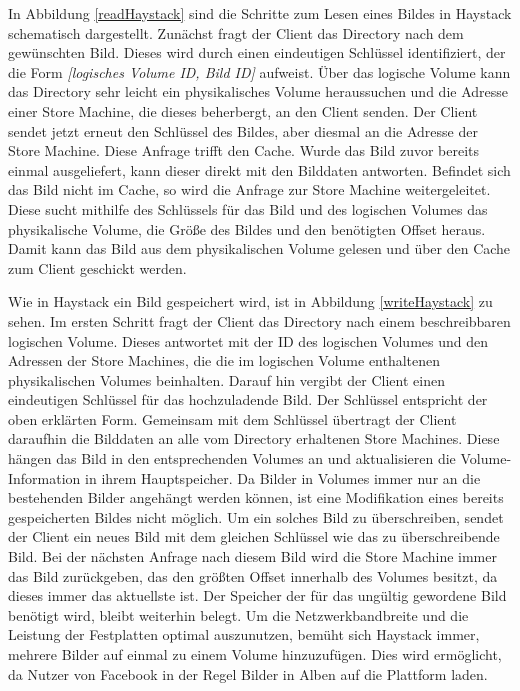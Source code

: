 \documentclass[12pt,oneside,a4paper,parskip]{scrbook}
\begin{document}
In Abbildung \ref{readHaystack} sind die Schritte zum Lesen eines Bildes in Haystack schematisch dargestellt. Zunächst fragt der Client das Directory nach dem gewünschten Bild. Dieses wird durch einen eindeutigen Schlüssel identifiziert, der die Form \textit{[logisches Volume ID, Bild ID]} aufweist. Über das logische Volume kann das Directory sehr leicht ein physikalisches Volume heraussuchen und die Adresse einer Store Machine, die dieses beherbergt, an den Client senden. Der Client sendet jetzt erneut den Schlüssel des Bildes, aber diesmal an die Adresse der Store Machine. Diese Anfrage trifft den Cache. Wurde das Bild zuvor bereits einmal ausgeliefert, kann dieser direkt mit den Bilddaten antworten. Befindet sich das Bild nicht im Cache, so wird die Anfrage zur Store Machine weitergeleitet. Diese sucht mithilfe des Schlüssels für das Bild und des logischen Volumes das physikalische Volume, die Größe des Bildes und den benötigten Offset heraus. Damit kann das Bild aus dem physikalischen Volume gelesen und über den Cache zum Client geschickt werden. 

Wie in Haystack ein Bild gespeichert wird, ist in Abbildung \ref{writeHaystack} zu sehen. Im ersten Schritt fragt der Client das Directory nach einem beschreibbaren logischen Volume. Dieses antwortet mit der ID des logischen Volumes und den Adressen der Store Machines, die die im logischen Volume enthaltenen physikalischen Volumes beinhalten. Darauf hin vergibt der Client einen eindeutigen Schlüssel für das hochzuladende Bild. Der Schlüssel entspricht der oben erklärten Form. Gemeinsam mit dem Schlüssel übertragt der Client daraufhin die Bilddaten an alle vom Directory erhaltenen Store Machines. Diese hängen das Bild in den entsprechenden Volumes an und aktualisieren die Volume-Information in ihrem Hauptspeicher. Da Bilder in Volumes immer nur an die bestehenden Bilder angehängt werden können, ist eine Modifikation eines bereits gespeicherten Bildes nicht möglich. Um ein solches Bild zu überschreiben, sendet der Client ein neues Bild mit dem gleichen Schlüssel wie das zu überschreibende Bild. Bei der nächsten Anfrage nach diesem Bild wird die Store Machine immer das Bild zurückgeben, das den größten Offset innerhalb des Volumes besitzt, da dieses immer das aktuellste ist. Der Speicher der für das ungültig gewordene Bild benötigt wird, bleibt weiterhin belegt. Um die Netzwerkbandbreite und die Leistung der Festplatten optimal auszunutzen, bemüht sich Haystack immer, mehrere Bilder auf einmal zu einem Volume hinzuzufügen. Dies wird ermöglicht, da Nutzer von Facebook in der Regel Bilder in Alben auf die Plattform laden.
\end{document}

